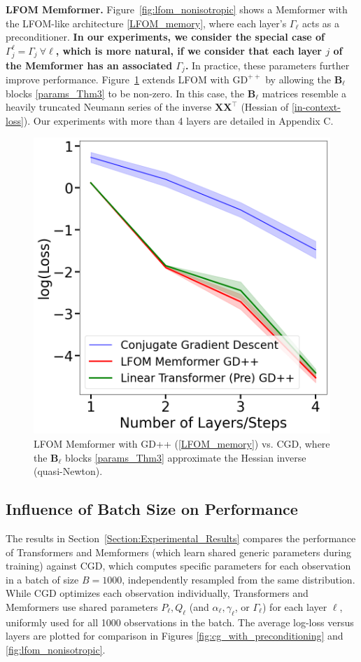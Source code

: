 \documentclass[11pt]{article}
\theoremstyle{plain}
\theoremstyle{definition}
\theoremstyle{remark}
\numberwithin{equation}{section}
\begin{document}
\textbf{LFOM Memformer.}
Figure~\ref{fig:lfom_nonisotropic} shows a Memformer with the LFOM-like architecture \eqref{LFOM_memory}, where each layer’s \(\Gamma_\ell\) acts as a preconditioner. \textbf{In our experiments, we consider the special case of \(\Gamma_j^\ell = \Gamma_j \ \forall \ell\), which is more natural, if we consider that each layer \(j\) of the Memformer has an associated \(\Gamma_j\).} In practice, these parameters further improve performance. Figure~\ref{fig:lfom_gdpp_nonisotropic} extends LFOM with \(\mathrm{GD}^{++}\) by allowing the \(\mathbf{B}_\ell\) blocks \eqref{params_Thm3} to be non-zero. In this case, the \( \mathbf{B}_\ell \) matrices resemble a heavily truncated Neumann series of the inverse \( \mathbf{X} \mathbf{X}^\top \) (Hessian of \eqref{in-context-loss}). Our experiments with more than 4 layers are detailed in Appendix C.
\begin{figure}[t]
  \centering
  \includegraphics[width=0.7\linewidth]{lfom_gdpp_nonisotropic.png}
  \caption{%
    LFOM Memformer with GD++ (\ref{LFOM_memory}) vs. CGD, 
    where the \(\mathbf{B}_\ell\) blocks \eqref{params_Thm3} approximate the Hessian inverse (quasi-Newton).%
  }
  \label{fig:lfom_gdpp_nonisotropic}
\end{figure}
\subsection{Influence of Batch Size on Performance}
\label{Section:Generalized_Performance}
The results in Section~\ref{Section:Experimental_Results} compares the performance of Transformers and Memformers (which learn shared generic parameters during training) against CGD, which computes specific parameters for each observation in a batch of size \( B = 1000 \), independently resampled from the same distribution. While CGD optimizes each observation individually, Transformers and Memformers use shared parameters \( P_\ell, Q_\ell \) (and \(\alpha_\ell, \gamma_\ell\), or \(\Gamma_\ell\)) for each layer \(\ell\), uniformly used for all 1000 observations in the batch. The average log-loss versus layers are plotted for comparison in Figures \ref{fig:cg_with_preconditioning} and \ref{fig:lfom_nonisotropic}. 
\end{document}
